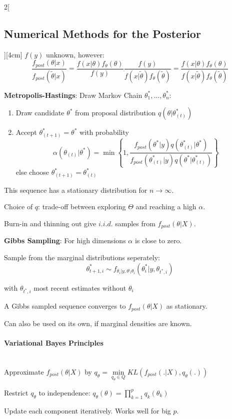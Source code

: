 \documentclass[8pt]{extarticle}
\begin{document}
\begin{multicols}{2}[\subsection{Numerical Methods for the Posterior}][4cm]
$f(y)$ unknown, however: $$\frac{f_{post}(\theta|x)}{f_{post}(\tilde{\theta}|x)} = \frac{f(x|\theta)f_\theta(\theta)}{f(y)} \frac{f(y)}{f(x|\tilde{\theta})f_\theta(\tilde{\theta})}= \frac{f(x|\theta)f_\theta(\theta)}{f(x|\tilde{\theta})f_\theta(\tilde{\theta})}$$

\vspace{0.5em}
 \textbf{Metropolis-Hastings}: Draw Markov Chain $\theta_1^*, ..., \theta_n^*$:
\begin{enumerate}
\item Draw candidate $\theta^*$ from proposal distribution $q\left(\theta|\theta_{(t)}^*\right)$
\item Accept $\theta^*_{(t+1)} = \theta^*$ with probability $$\alpha(\theta_{(t)}|\theta^*) = \min\left\{1,\frac{f_{post}\left(\theta^*|y\right)q\left(\theta_{(t)}^*|\theta^*\right)}{f_{post}\left(\theta_{(t)}^*|y\right)q\left(\theta^*|\theta_{(t)}^*\right)}\right\}$$
else choose $\theta^*_{(t+1)} = \theta_{(t)}^*$
\end{enumerate}
This sequence has a stationary distribution for $n\rightarrow \infty$.

\noindent Choice of $q$: trade-off between exploring $\Theta$ and reaching a high $\alpha$.

\noindent Burn-in and thinning out give $i.i.d.$ samples from $f_{post}(\theta|X)$.

\textbf{Gibbs Sampling}: For high dimensions $\alpha$ is close to zero.

Sample from the marginal distributions seperately:
 $$\theta_{t{+}1,i}^* \sim f_{\theta_i | y, \theta \setminus \theta_i}\left(\theta_i^*|y, \theta_{t^*,i}\right)$$ 
 
 with $\theta_{t^*, i}$ most recent estimates without $\theta_i$
 
 \noindent A Gibbs sampled sequence converges to $f_{post}(\theta|X)$ as stationary.
 
 \noindent Can also be used on its own, if marginal densities are known.


\paragraph{Variational Bayes Principles}  \ \\

Approximate $f_{post}(\theta|X)$ by $q_\theta=\underset{q_\theta\in Q}{\min} KL(f_{post}(.|X), q_\theta(.))$

Restrict $q_\theta$ to independence: $q_\theta(\theta) = \prod_{k=1}^p q_k(\theta_k)$

Update each component iteratively.
Works well for big $p$. 
\end{multicols}
\end{document}
